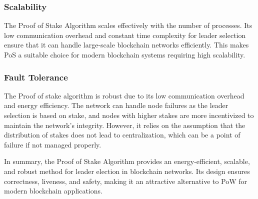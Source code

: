 \subsubsection{Scalability}

The Proof of Stake Algorithm scales effectively with the number of processes. Its low communication overhead and constant time complexity for leader selection ensure that it can handle large-scale blockchain networks efficiently. This makes PoS a suitable choice for modern blockchain systems requiring high scalability.

\subsubsection{Fault Tolerance}
The Proof of stake algorithm is robust due to its low communication overhead and energy efficiency. The network can handle node failures as the leader selection is based on stake, and nodes with higher stakes are more incentivized to maintain the network's integrity. However, it relies on the assumption that the distribution of stakes does not lead to centralization, which can be a point of failure if not managed properly.



In summary, the Proof of Stake Algorithm provides an energy-efficient, scalable, and robust method for leader election in blockchain networks. Its design ensures correctness, liveness, and safety, making it an attractive alternative to PoW for modern blockchain applications.




